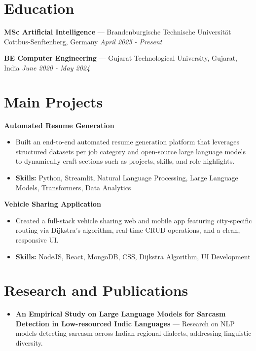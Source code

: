 \documentclass[a4paper,10pt]{article}
\begin{document}
\section*{Education}
\textbf{MSc Artificial Intelligence} — Brandenburgische Technische Universität Cottbus-Senftenberg, Germany \hfill \textit{April 2025 - Present}\par
\vspace{1.5pt}
\textbf{BE Computer Engineering} — Gujarat Technological University, Gujarat, India \hfill \textit{June 2020 - May 2024}\par

\section*{Main Projects}
\textbf{Automated Resume Generation}\par
\vspace{1pt}
\begin{itemize}
  \item Built an end-to-end automated resume generation platform that leverages structured datasets per job category and open-source large language models to dynamically craft sections such as projects, skills, and role highlights.
  \item \textbf{Skills:} Python, Streamlit, Natural Language Processing, Large Language Models, Transformers, Data Analytics
\end{itemize}
\vspace{3pt}
\textbf{Vehicle Sharing Application}\par
\vspace{1pt}
\begin{itemize}
  \item Created a full-stack vehicle sharing web and mobile app featuring city-specific routing via Dijkstra's algorithm, real-time CRUD operations, and a clean, responsive UI.
  \item \textbf{Skills:} NodeJS, React, MongoDB, CSS, Dijkstra Algorithm, UI Development
\end{itemize}

\section*{Research and Publications}
\begin{itemize}
\item \textbf{An Empirical Study on Large Language Models for Sarcasm Detection in Low-resourced Indic Languages} — Research on NLP models detecting sarcasm across Indian regional dialects, addressing linguistic diversity.
\end{itemize}
\end{document}
